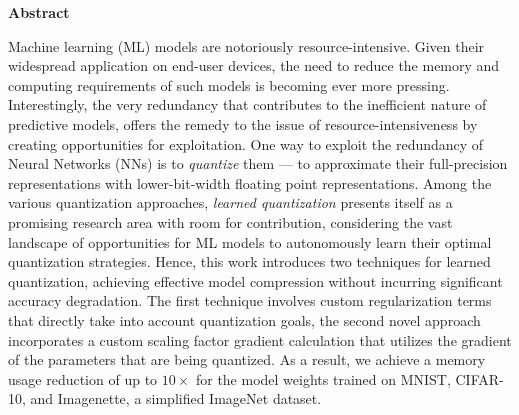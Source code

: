 \thispagestyle{empty}
\vspace*{1.0cm}

\begin{center}
    \textbf{Abstract} \label{abstract}
\end{center}

\vspace*{0.5cm}

\noindent Machine learning (ML) models are notoriously resource-intensive.
Given their widespread application on end-user devices,
the need to reduce the memory and computing requirements of such models is becoming ever more pressing.
Interestingly, the very redundancy that contributes to the inefficient nature of predictive models, 
offers the remedy to the issue of resource-intensiveness by creating opportunities for exploitation.
One way to exploit the redundancy of Neural Networks (NNs) is to 
\textit{quantize} them — 
to approximate their full-precision representations with lower-bit-width floating point representations.
Among the various quantization approaches, 
\textit{learned quantization} presents itself as a promising research area with 
room for contribution, considering the vast landscape of opportunities for
ML models to autonomously learn their optimal quantization strategies.
Hence, this work introduces two techniques for learned quantization,
achieving effective model compression without incurring significant accuracy degradation.
The first technique involves custom regularization terms that directly take into account
quantization goals, the second novel approach incorporates a custom scaling factor gradient calculation that utilizes 
the gradient of the parameters that are being quantized.
As a result, we achieve a memory usage reduction of up to \( 10 \times \) for the model weights
trained on MNIST, CIFAR-10, and Imagenette, a simplified ImageNet dataset. 

